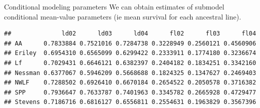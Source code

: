 \documentclass[
  ignorenonframetext,
]{beamer}
\newenvironment{Shaded}{\begin{snugshade}}{\end{snugshade}}
\newcommand{\AttributeTok}[1]{\textcolor[rgb]{0.13,0.29,0.53}{#1}}
\newcommand{\ConstantTok}[1]{\textcolor[rgb]{0.56,0.35,0.01}{#1}}
\newcommand{\DecValTok}[1]{\textcolor[rgb]{0.00,0.00,0.81}{#1}}
\newcommand{\FunctionTok}[1]{\textcolor[rgb]{0.13,0.29,0.53}{\textbf{#1}}}
\newcommand{\NormalTok}[1]{#1}
\newcommand{\OtherTok}[1]{\textcolor[rgb]{0.56,0.35,0.01}{#1}}
\newcommand{\SpecialCharTok}[1]{\textcolor[rgb]{0.81,0.36,0.00}{\textbf{#1}}}
\newcommand{\StringTok}[1]{\textcolor[rgb]{0.31,0.60,0.02}{#1}}
\begin{document}
\begin{frame}[fragile]{Conditional modeling parameters}
\protect\hypertarget{conditional-modeling-parameters}{}
We can obtain estimates of submodel conditional mean-value parameters
(ie mean survival for each ancestral line).

\vspace{12pt}
\tiny

\begin{Shaded}
\end{Shaded}

\begin{verbatim}
##              ld02      ld03      ld04      fl02      fl03      fl04
## AA      0.7833884 0.7521016 0.7284738 0.3228949 0.2560121 0.4560906
## Eriley  0.6954310 0.6565099 0.6299422 0.2333911 0.1774180 0.3236674
## Lf      0.7029431 0.6646121 0.6382397 0.2404182 0.1834251 0.3342160
## Nessman 0.6377067 0.5946209 0.5668688 0.1824325 0.1347627 0.2469403
## NWLF    0.7288502 0.6926410 0.6670184 0.2654522 0.2050578 0.3716382
## SPP     0.7936647 0.7633787 0.7401963 0.3345782 0.2665928 0.4729477
## Stevens 0.7186716 0.6816127 0.6556811 0.2554631 0.1963829 0.3567396
\end{verbatim}
\end{frame}
\end{document}

